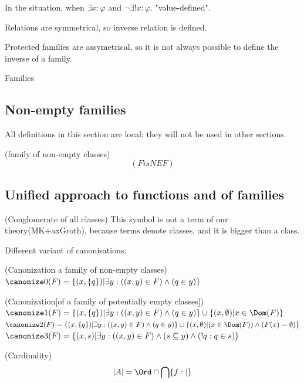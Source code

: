 In the situation, when $\exists x: \varphi$ and $\neg\exists! x: \varphi$.
"value-defined".

Relations are symmetrical, so inverse relation is defined.

Protected families are assymetrical, so it is not always possible to define the inverse of a family.

Families 
\subsection{Non-empty families}
All definitions in this section are local: they will not be used in other sections.
\begin{definition}(family of non-empty classes)
\[
(F is NEF) 
\]
\end{definition}



\subsection{Unified approach to functions and of families}

\begin{definition}(Conglomerate of all classes)
This symbol is not a term of our theory(MK+axGroth), because terms denote classes, and it is bigger than a class.
\end{definition}
Different variant of canonisations:
\begin{definition}(Canonization a family of non-empty classes)\\
$
\canonize0(F) = \{(x,\{q\})|\exists y:((x,y)\in F)\land (q\in y)\}
$\\

\end{definition}
\begin{definition}(Canonization[of a family of potentially empty classes])\\
$
\canonize1(F) = \{(x,\{q\})|\exists y:((x,y)\in F)\land (q\in y)\}\cup\{(x,\emptyset)|x\in\Dom(F)\}
$\\
$
\canonize2(F) = \{(x,\{q\})|\exists y:((x,y)\in F)\land (q\in y)\}\cup\{(x,\emptyset)|(x\in\Dom(F))\land (F(x)=\emptyset) \}
$\\
$
\canonize3(F) = \{(x,s)|\exists y:((x,y)\in F)\land (s\subseteq y) \land (!q:q\in s)\}
$\\

\end{definition}

\begin{definition}(Cardinality)\\
\[
|A|=\Ord\cap\bigcap \{f: | \}
\]
\end{definition}

